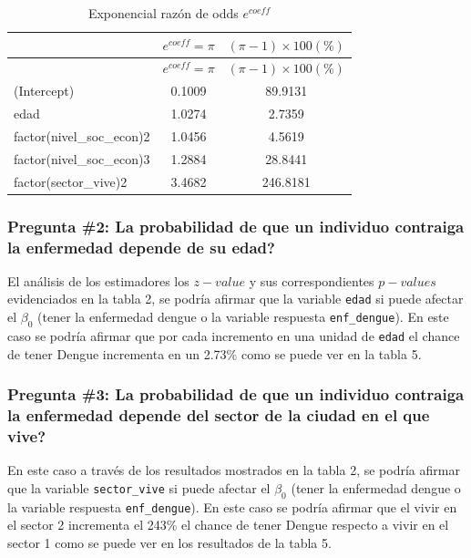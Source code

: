 \documentclass[
]{article}
\begin{document}
\begin{longtable}[]{@{}lcc@{}}
\caption{Exponencial razón de odds \(e^{coeff}\)}\tabularnewline
\toprule
& \(e^{coeff} = \pi\) & \((\pi-1)\times100 (\%)\)\tabularnewline
\midrule
\endfirsthead
\toprule
& \(e^{coeff} = \pi\) & \((\pi-1)\times100 (\%)\)\tabularnewline
\midrule
\endhead
(Intercept) & 0.1009 & 89.9131\tabularnewline
edad & 1.0274 & 2.7359\tabularnewline
factor(nivel\_soc\_econ)2 & 1.0456 & 4.5619\tabularnewline
factor(nivel\_soc\_econ)3 & 1.2884 & 28.8441\tabularnewline
factor(sector\_vive)2 & 3.4682 & 246.8181\tabularnewline
\bottomrule
\end{longtable}

\hypertarget{pregunta-2-la-probabilidad-de-que-un-individuo-contraiga-la-enfermedad-depende-de-su-edad}{%
\subsubsection{Pregunta \#2: La probabilidad de que un individuo
contraiga la enfermedad depende de su
edad?}\label{pregunta-2-la-probabilidad-de-que-un-individuo-contraiga-la-enfermedad-depende-de-su-edad}}

El análisis de los estimadores los \(z-value\) y sus correspondientes
\(p-values\) evidenciados en la tabla 2, se podría afirmar que la
variable \texttt{edad} si puede afectar el \(\beta_0\) (tener la
enfermedad dengue o la variable respuesta \texttt{enf\_dengue}). En este
caso se podría afirmar que por cada incremento en una unidad de
\texttt{edad} el chance de tener Dengue incrementa en un 2.73\% como se
puede ver en la tabla 5.

\hypertarget{pregunta-3-la-probabilidad-de-que-un-individuo-contraiga-la-enfermedad-depende-del-sector-de-la-ciudad-en-el-que-vive}{%
\subsubsection{Pregunta \#3: La probabilidad de que un individuo
contraiga la enfermedad depende del sector de la ciudad en el que
vive?}\label{pregunta-3-la-probabilidad-de-que-un-individuo-contraiga-la-enfermedad-depende-del-sector-de-la-ciudad-en-el-que-vive}}

En este caso a través de los resultados mostrados en la tabla 2, se
podría afirmar que la variable \texttt{sector\_vive} si puede afectar el
\(\beta_0\) (tener la enfermedad dengue o la variable respuesta
\texttt{enf\_dengue}). En este caso se podría afirmar que el vivir en el
sector 2 incrementa el 243\% el chance de tener Dengue respecto a vivir
en el sector 1 como se puede ver en los resultados de la tabla 5.
\end{document}

